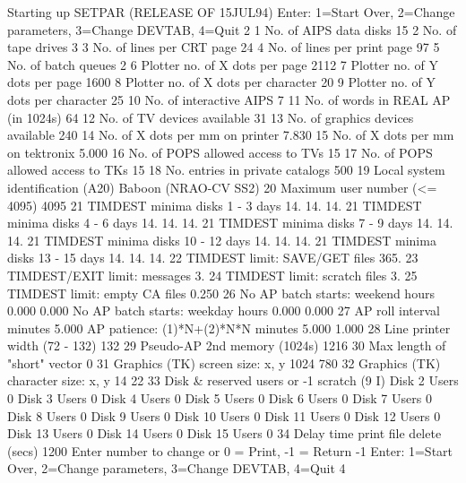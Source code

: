 Starting up SETPAR (RELEASE OF 15JUL94)
Enter:  1=Start Over, 2=Change parameters, 3=Change DEVTAB, 4=Quit
2
  1  No. of AIPS data disks                 15
  2  No. of tape drives                      3
  3  No. of lines per CRT page              24
  4  No. of lines per print page            97
  5  No. of batch queues                     2
  6  Plotter no. of X dots per page       2112
  7  Plotter no. of Y dots per page       1600
  8  Plotter no. of X dots per character    20
  9  Plotter no. of Y dots per character    25
 10  No. of interactive AIPS                 7
 11  No. of words in REAL AP (in 1024s)     64
 12  No. of TV devices available            31
 13  No. of graphics devices available     240
 14  No. of X dots per mm on printer     7.830
 15  No. of X dots per mm on tektronix   5.000
 16  No. of POPS allowed access to TVs      15
 17  No. of POPS allowed access to TKs      15
 18  No. entries in private catalogs       500
 19  Local system identification (A20)  Baboon (NRAO-CV SS2)
 20  Maximum user number (<= 4095)        4095
 21  TIMDEST minima disks  1 -  3 days   14.  14.  14.
 21  TIMDEST minima disks  4 -  6 days   14.  14.  14.
 21  TIMDEST minima disks  7 -  9 days   14.  14.  14.
 21  TIMDEST minima disks 10 - 12 days   14.  14.  14.
 21  TIMDEST minima disks 13 - 15 days   14.  14.  14.
 22  TIMDEST limit: SAVE/GET files       365.
 23  TIMDEST/EXIT limit: messages          3.
 24  TIMDEST limit: scratch files          3.
 25  TIMDEST limit: empty CA files       0.250
 26  No AP batch starts: weekend hours   0.000 0.000
     No AP batch starts: weekday hours   0.000 0.000
 27  AP roll interval minutes            5.000
     AP patience: (1)*N+(2)*N*N minutes  5.000 1.000
 28  Line printer width (72 - 132)         132
 29  Pseudo-AP 2nd memory (1024s)         1216
 30  Max length of "short" vector            0
 31  Graphics (TK) screen size: x, y      1024   780
 32  Graphics (TK) character size: x, y     14    22
 33  Disk & reserved users or -1 scratch (9 I)
     Disk  2 Users    0
     Disk  3 Users    0
     Disk  4 Users    0
     Disk  5 Users    0
     Disk  6 Users    0
     Disk  7 Users    0
     Disk  8 Users    0
     Disk  9 Users    0
     Disk 10 Users    0
     Disk 11 Users    0
     Disk 12 Users    0
     Disk 13 Users    0
     Disk 14 Users    0
     Disk 15 Users    0
 34  Delay time print file delete (secs)  1200
Enter number to change or  0 = Print, -1 = Return
-1
Enter:  1=Start Over, 2=Change parameters, 3=Change DEVTAB, 4=Quit
4
\endfortran

